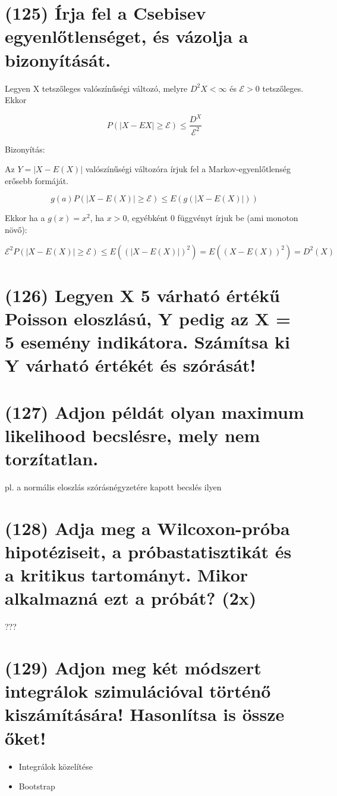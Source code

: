\documentclass[12p]{article}
\begin{document}
\section{(125) Írja fel a Csebisev egyenlőtlenséget, és vázolja a bizonyítását.}

Legyen X tetszőleges valószínűségi változó, melyre $D^2X < \infty$ és $\mathcal{E} > 0$ tetszőleges. Ekkor

$$P(|X - EX| \geq \mathcal{E}) \leq \frac{D^X}{\mathcal{E}^2}$$

Bizonyítás:

Az $Y = |X - E(X)|$ valószínűségi változóra írjuk fel a Markov-egyenlőtlenség erősebb formáját.

$$g(a)P(|X - E(X)| \geq \mathcal{E}) \leq E(g(|X - E(X)|))$$

Ekkor ha a $g(x) = x^2$, ha $x > 0$, egyébként 0 függvényt írjuk be (ami monoton növő):

$$\mathcal{E}^2P(|X - E(X)| \geq \mathcal{E}) \leq E((|X - E(X)|)^2) = E((X - E(X))^2) = D^2(X)$$

\section{(126) Legyen X 5 várható értékű Poisson eloszlású, Y pedig az X = 5 esemény indikátora. Számítsa ki Y várható értékét és szórását!}

\section{(127) Adjon példát olyan maximum likelihood becslésre, mely nem torzítatlan.}

pl. a normális eloszlás szórásnégyzetére kapott becslés ilyen

\section{(128) Adja meg a Wilcoxon-próba hipotéziseit, a próbastatisztikát és a kritikus tartományt.
Mikor alkalmazná ezt a próbát? (2x)}

???

\section{(129) Adjon meg két módszert integrálok szimulációval történő kiszámítására! Hasonlítsa is
össze őket!}

\begin{itemize}
\item Integrálok közelítése
\item Bootstrap
\end{itemize}
\end{document}
